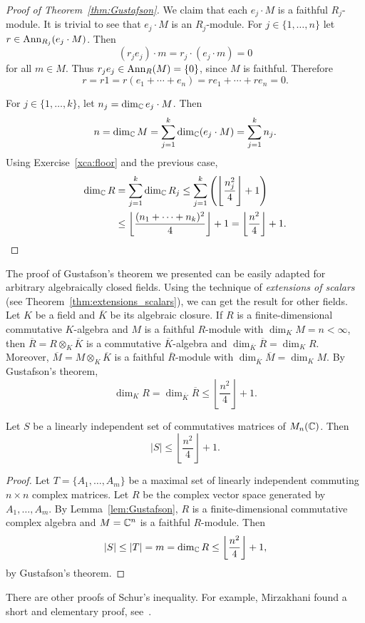 \begin{proof}[Proof of Theorem~\ref{thm:Gustafson}]
    We claim that each $e_j\cdot M$ is a faithful $R_j$-module. It is trivial to see that
    $e_j\cdot M$ is an $R_j$-module. For $j\in\{1,\dots,n\}$ let $r\in\operatorname{Ann}_{R_j}(e_j\cdot M)$. Then
    \[
    (r_je_j)\cdot m=r_j\cdot (e_j\cdot m)=0
    \]
    for all $m\in M$. Thus $r_je_j\in\operatorname{Ann}_R(M)=\{0\}$, since $M$ is faithful. Therefore
    \[
    r=r1=r(e_1+\cdots+e_n)=re_1+\cdots+re_n=0.
    \]
    
    For $j\in\{1,\dots,k\}$, let $n_j=\dim_{\mathbb{C}}e_j\cdot M$. Then 
    \[
    n=\dim_{\mathbb{C}}M=\sum_{j=1}^k\dim_{\mathbb{C}}(e_j\cdot M)=\sum_{j=1}^kn_j.
    \]
    Using Exercise~\ref{xca:floor} and the previous case, 
    \begin{align*}
    \dim_{\mathbb{C}}R&=\sum_{j=1}^k\dim_{\mathbb{C}}R_j
    \leq\sum_{j=1}^k \left(\left\lfloor \frac{n_j^2}{4}\right\rfloor+1\right)\\
    &\leq\left\lfloor\frac{(n_1+\cdots+n_k)^2}{4}\right\rfloor+1
    =\left\lfloor\frac{n^2}{4}\right\rfloor+1.\qedhere     
    \end{align*}
    
    
\end{proof}

The proof of Gustafson's theorem we presented 
can be easily adapted for arbitrary algebraically closed fields. Using the technique of \emph{extensions 
of scalars} (see Theorem~\ref{thm:extensions_scalars}), 
we can get the result for other fields. Let $K$ be a field and $\overline{K}$ be its algebraic closure. 
If $R$ is a finite-dimensional commutative 
$K$-algebra and $M$ is a faithful $R$-module with $\dim_KM=n<\infty$, then 
$\overline{R}=R\otimes_K\overline{K}$ is a commutative $\overline{K}$-algebra and
$\dim_{\overline{K}}\overline{R}=\dim_KR$. Moreover, $\overline{M}=M\otimes_K\overline{K}$ is a faithful
$\overline{R}$-module with 
$\dim_{\overline{K}}\overline{M}=\dim_KM$. By Gustafson's theorem, 
\[
\dim_KR=\dim_{\overline{K}}\overline{R}\leq\left\lfloor\frac{n^2}{4}\right\rfloor+1.
\]

\begin{theorem}[Schur]
\label{thm:Schur_matrices}
    Let $S$ be a linearly independent set of commutatives matrices of $M_n(\mathbb{C})$. Then
    \[
    |S|\leq \left\lfloor\frac{n^2}{4}\right\rfloor+1.
    \]
\end{theorem}

\begin{proof}
    Let $T=\{A_1,\dots,A_m\}$ be a maximal set of linearly independent commuting $n\times n$ complex matrices. Let $R$ 
    be the complex vector space generated by $A_1,\dots,A_m$. By Lemma~\ref{lem:Gustafson}, 
    $R$ is a finite-dimensional commutative
    complex algebra and $M=\mathbb{C}^n$ is a faithful $R$-module. Then
    \[
    |S|\leq |T|=m=\dim_{\mathbb{C}}R\leq\left\lfloor\frac{n^2}{4}\right\rfloor+1,
    \]
    by Gustafson's theorem. 
\end{proof}

There are other proofs of Schur's inequality. For example, Mirzakhani found a short and 
elementary proof, see~\cite{zbMATH01234865}.

